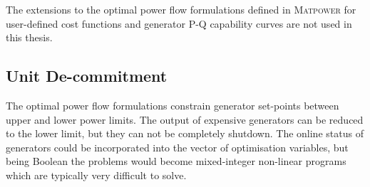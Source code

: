 The extensions to the optimal power flow formulations defined in
\textsc{Matpower} for user-defined cost functions and generator P-Q capability
curves are not used in this thesis.

%

\subsection{Unit De-commitment}
\label{sec:decommit}
The optimal power flow formulations constrain generator set-points between
upper and lower power limits.  The output of expensive generators can be
reduced to the lower limit, but they can not be completely shutdown.  The
online status of generators could be incorporated into the vector of
optimisation variables, but being Boolean the problems would become
mixed-integer non-linear programs which are typically very difficult to
solve.

